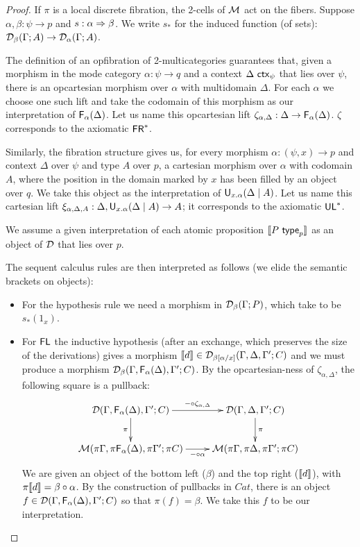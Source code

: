 \begin{proof}
If $\pi$ is a local discrete fibration, the 2-cells of $\mathcal{M}$ act on the
fibers. Suppose $\alpha, \beta : \psi \to p$ and $s : \alpha \Rightarrow
\beta$. We write $s_*$ for the induced function (of sets):
$\mathcal{D}_\beta(\Gamma; A) \to \mathcal{D}_\alpha(\Gamma; A)$.  

The definition of an opfibration of 2-multicategories guarantees that,
given a morphism in the mode category $\alpha : \psi \to q$ and a
context $\Delta \,\, \mathsf{ctx}_{\psi}$ that lies over $\psi$, there is an
opcartesian morphism over $\alpha$ with multidomain $\Delta$. For each
$\alpha$ we choose one such lift and take the codomain of this morphism
as our interpretation of $\mathsf{F}_{\alpha}(\Delta)$. Let us name this
opcartesian lift $\zeta_{\alpha, \Delta} : \Delta \to
\mathsf{F}_{\alpha}(\Delta)$. $\zeta$ corresponds to the axiomatic $\mathsf{FR}^*$.

Similarly, the fibration structure gives us, for every morphism $\alpha
: (\psi,x) \to p$ and context $\Delta$ over $\psi$ and type $A$ over
$p$, a cartesian morphism over $\alpha$ with codomain $A$, where the
position in the domain marked by $x$ has been filled by an object over
$q$. We take this object as the interpretation of
$\mathsf{U}_{x.\alpha}(\Delta \mid A)$.  Let us name this cartesian lift
$\xi_{\alpha, \Delta,A} : \Delta,\mathsf{U}_{x.\alpha}(\Delta \mid A) \to A$; it
corresponds to the axiomatic $\mathsf{UL}^*$.  

We assume a given interpretation of each atomic proposition $\llbracket
P \,\, \mathsf{type}_{p} \rrbracket$ as an object of $\mathcal{D}$ that lies over $p$.

The sequent calculus rules are then interpreted as follows (we elide the
semantic brackets on objects):

\begin{itemize}
\item For the hypothesis rule
we need a morphism in $\mathcal{D}_\beta(\Gamma; P)$, which take to be $s_*(1_x)$.
\item For $\mathsf{FL}$
the inductive hypothesis (after an exchange, which preserves the size of
the derivations) gives a morphism $\llbracket d \rrbracket \in \mathcal{D}_{\beta[\alpha/x]}(\Gamma, \Delta, \Gamma'; C)$ and we must produce a morphism
$\mathcal{D}_{\beta}(\Gamma, \mathsf{F}_{\alpha}(\Delta),\Gamma'; C)$. By the
opcartesian-ness of $\zeta_{\alpha, \Delta}$, the following square is a
pullback:
\[ \xymatrix{
    \cD(\Gamma,\F{\alpha}{\Delta},\Gamma';C) \ar[r]^-{-\circ \zeta_{\alpha, \Delta}} \ar[d]_\pi &
    \cD(\Gamma,\Delta,\Gamma';C) \ar[d]^\pi \\
    \M(\pi\Gamma,\pi \F{\alpha}{\Delta}, \pi\Gamma'; \pi C) \ar[r]_-{-\circ \alpha} &
    \M(\pi\Gamma,\pi\Delta,\pi\Gamma'; \pi C)
}\]
We are given an object of the bottom left ($\beta$) and the top right
($\llbracket d \rrbracket$), with $\pi\llbracket d \rrbracket = \beta \circ \alpha$. By the
construction of pullbacks in $Cat$, there is an object $f \in
\mathcal{D}(\Gamma,\mathsf{F}_{\alpha}(\Delta),\Gamma';C)$ so that $\pi(f) = \beta$. We take
this $f$ to be our interpretation.


\end{itemize}
\end{proof}
